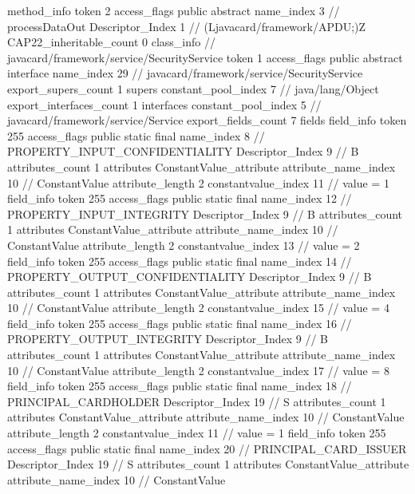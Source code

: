 {{{{{				}
				method_info {
					token	2
					access_flags	public abstract
					name_index	3		// processDataOut
					Descriptor_Index	1		// (Ljavacard/framework/APDU;)Z
				}
			}
			CAP22_inheritable_count	0
		}
		class_info {		// javacard/framework/service/SecurityService
			token	1
			access_flags	public abstract interface
			name_index	29		// javacard/framework/service/SecurityService
			export_supers_count	1
			supers {
				constant_pool_index	7		// java/lang/Object
			}
			export_interfaces_count	1
			interfaces {
				constant_pool_index	5		// javacard/framework/service/Service
			}
			export_fields_count	7
			fields {
			field_info {
				token	255
				access_flags	public static final
				name_index	8		// PROPERTY_INPUT_CONFIDENTIALITY
				Descriptor_Index	9		// B
				attributes_count	1
				attributes {
				ConstantValue_attribute {
					attribute_name_index	10		// ConstantValue
					attribute_length	2
					constantvalue_index	11		// value = 1
				}
				}
			}
			field_info {
				token	255
				access_flags	public static final
				name_index	12		// PROPERTY_INPUT_INTEGRITY
				Descriptor_Index	9		// B
				attributes_count	1
				attributes {
				ConstantValue_attribute {
					attribute_name_index	10		// ConstantValue
					attribute_length	2
					constantvalue_index	13		// value = 2
				}
				}
			}
			field_info {
				token	255
				access_flags	public static final
				name_index	14		// PROPERTY_OUTPUT_CONFIDENTIALITY
				Descriptor_Index	9		// B
				attributes_count	1
				attributes {
				ConstantValue_attribute {
					attribute_name_index	10		// ConstantValue
					attribute_length	2
					constantvalue_index	15		// value = 4
				}
				}
			}
			field_info {
				token	255
				access_flags	public static final
				name_index	16		// PROPERTY_OUTPUT_INTEGRITY
				Descriptor_Index	9		// B
				attributes_count	1
				attributes {
				ConstantValue_attribute {
					attribute_name_index	10		// ConstantValue
					attribute_length	2
					constantvalue_index	17		// value = 8
				}
				}
			}
			field_info {
				token	255
				access_flags	public static final
				name_index	18		// PRINCIPAL_CARDHOLDER
				Descriptor_Index	19		// S
				attributes_count	1
				attributes {
				ConstantValue_attribute {
					attribute_name_index	10		// ConstantValue
					attribute_length	2
					constantvalue_index	11		// value = 1
				}
				}
			}
			field_info {
				token	255
				access_flags	public static final
				name_index	20		// PRINCIPAL_CARD_ISSUER
				Descriptor_Index	19		// S
				attributes_count	1
				attributes {
				ConstantValue_attribute {
					attribute_name_index	10		// ConstantValue
}}}}}}}
